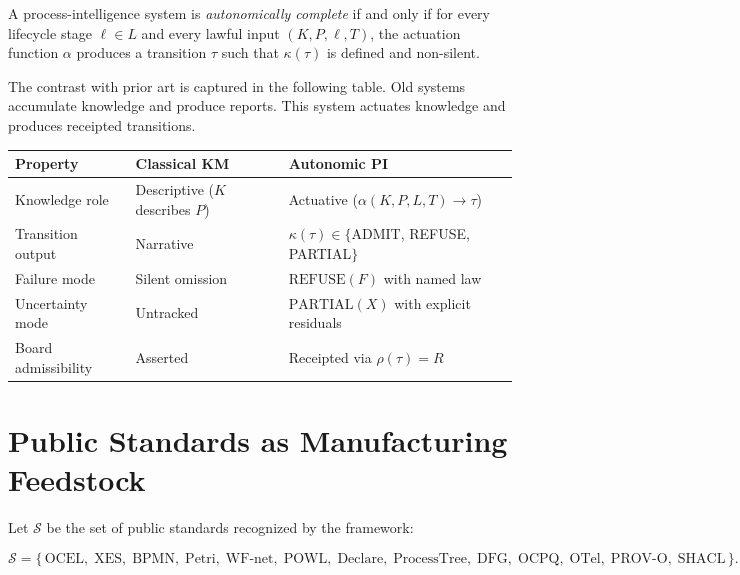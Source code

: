 \begin{proposition}
\label{prop:autonomic-completeness}
A process-intelligence system is \emph{autonomically complete} if and only if
for every lifecycle stage $\ell \in L$ and every lawful input $(K, P, \ell, T)$,
the actuation function $\alpha$ produces a transition $\tau$ such that
$\kappa(\tau)$ is defined and non-silent.
\end{proposition}

The contrast with prior art is captured in the following table. Old systems
accumulate knowledge and produce reports. This system actuates knowledge and
produces receipted transitions.

\begin{center}
\begin{tabular}{lll}
\toprule
\textbf{Property} & \textbf{Classical KM} & \textbf{Autonomic PI} \\
\midrule
Knowledge role & Descriptive ($K$ describes $P$) & Actuative
  ($\alpha(K,P,L,T) \to \tau$) \\
Transition output & Narrative & $\kappa(\tau) \in \{$ADMIT, REFUSE, PARTIAL$\}$ \\
Failure mode & Silent omission & $\mathrm{REFUSE}(F)$ with named law \\
Uncertainty mode & Untracked & $\mathrm{PARTIAL}(X)$ with explicit residuals \\
Board admissibility & Asserted & Receipted via $\rho(\tau) = R$ \\
\bottomrule
\end{tabular}
\end{center}

\section{Public Standards as Manufacturing Feedstock}
\label{sec:pi-standards}

Let $\mathcal{S}$ be the set of public standards recognized by the framework:

\begin{equation}
\label{eq:standards}
\mathcal{S} = \{\,\mathrm{OCEL},\; \mathrm{XES},\; \mathrm{BPMN},\;
  \mathrm{Petri},\; \mathrm{WF\text{-}net},\; \mathrm{POWL},\;
  \mathrm{Declare},\; \mathrm{ProcessTree},\; \mathrm{DFG},\;
  \mathrm{OCPQ},\; \mathrm{OTel},\; \mathrm{PROV\text{-}O},\;
  \mathrm{SHACL}\,\}.
\end{equation}

